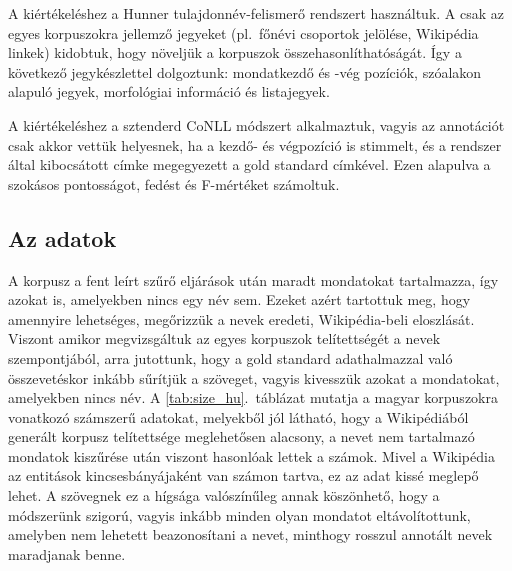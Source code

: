 \documentclass{llncs}
\begin{document}
A kiértékeléshez a Hunner \cite{Varga} tulajdonnév-felismerő rendszert használtuk. A csak az egyes korpuszokra jellemző jegyeket (pl.~főnévi csoportok jelölése, Wikipédia linkek) kidobtuk, hogy növeljük a korpuszok összehasonlíthatóságát. Így a következő jegykészlettel dolgoztunk: mondatkezdő és -vég pozíciók, szóalakon alapuló jegyek, morfológiai információ és listajegyek. 

A kiértékeléshez a sztenderd CoNLL módszert alkalmaztuk, vagyis az annotációt csak akkor vettük helyesnek, ha a kezdő- és végpozíció is stimmelt, és a rendszer által kibocsátott címke megegyezett a gold standard címkével. Ezen alapulva a szokásos pontosságot, fedést és F-mértéket számoltuk. 

\subsection{Az adatok}

A korpusz a fent leírt szűrő eljárások után maradt mondatokat tartalmazza, így azokat is, amelyekben nincs egy név sem. Ezeket azért tartottuk meg, hogy amennyire lehetséges, megőrizzük a nevek eredeti, Wikipédia-beli eloszlását. Viszont amikor megvizsgáltuk az egyes korpuszok telítettségét a nevek szempontjából, arra jutottunk, hogy a gold standard adathalmazzal való összevetéskor inkább sűrítjük a szöveget, vagyis kivesszük azokat a mondatokat, amelyekben nincs név. A \ref{tab:size_hu}.~táblázat mutatja a magyar korpuszokra vonatkozó számszerű adatokat, melyekből jól látható, hogy a Wikipédiából generált korpusz telítettsége meglehetősen alacsony, a nevet nem tartalmazó mondatok kiszűrése után viszont hasonlóak lettek a számok. Mivel a Wikipédia az entitások kincsesbányájaként van számon tartva, ez az adat kissé meglepő lehet. A szövegnek ez a hígsága valószínűleg annak köszönhető, hogy a módszerünk szigorú, vagyis inkább minden olyan mondatot eltávolítottunk, amelyben nem lehetett beazonosítani a nevet, minthogy rosszul annotált nevek maradjanak benne. 

 
\end{document}
